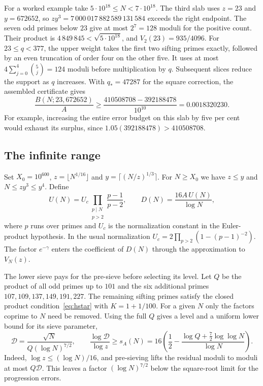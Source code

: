 \documentclass[11pt]{article}
\theoremstyle{remark}\newtheorem{remark}[theorem]{Remark}
\begin{document}
For a worked example take $5\cdot10^{18}\le N<7\cdot10^{18}$. The third slab uses $z=23$ and $y=672652$, so $zy^3=7\,000\,017\,882\,589\,131\,584$ exceeds the right endpoint. The seven odd primes below $23$ give at most $2^7=128$ moduli for the positive count. Their product is $4\,849\,845<\sqrt{5\cdot10^{18}}$, and $V_2(23)=935/4096$. For $23\le q<377$, the upper weight takes the first two sifting primes exactly, followed by an even truncation of order four on the other five. It uses at most $4\sum_{j=0}^4\binom5j=124$ moduli before multiplication by $q$. Subsequent slices reduce the support as $q$ increases. With $q_*=47287$ for the square correction, the assembled certificate gives
\[
 \frac{B(N;23,672652)}{A}
 \ge\frac{410508708-392188478}{10^{10}}
 =0.0018320230 .
\]
For example, increasing the entire error budget on this slab by five per cent would exhaust its surplus, since $1.05(392188478)>410508708$.

\subsection{The infinite range}

Set $X_0=10^{600}$, $z=\lfloor N^{1/16}\rfloor$ and $y=\lceil(N/z)^{1/3}\rceil$. For $N\ge X_0$ we have $z\le y$ and $N\le zy^3\le y^4$. Define
\[
 U(N)=U_c\prod_{\substack{p\mid N\\p>2}}\frac{p-1}{p-2},
 \qquad D(N)=\frac{16 A\,U(N)}{\log N},
\]
where $p$ runs over primes and $U_c$ is the normalization constant in the Euler-product hypothesis. In the usual normalization $U_c=2\prod_{p>2}(1-(p-1)^{-2})$. The factor $e^{-\gamma}$ enters the coefficient of $D(N)$ through the approximation to $V_N(z)$.

The lower sieve pays for the pre-sieve before selecting its level. Let $Q$ be the product of all odd primes up to $101$ and the six additional primes $107,109,137,149,191,227$. The remaining sifting primes satisfy the closed product condition~\eqref{eq:hstar} with $K=1+1/100$. For a given $N$ only the factors coprime to $N$ need be removed. Using the full $Q$ gives a level and a uniform lower bound for its sieve parameter,
\[
 \mathcal D=\frac{\sqrt N}{Q(\log N)^{7/2}},\qquad
 \frac{\log\mathcal D}{\log z}\ge s_A(N)
 =16\left(\frac12-\frac{\log Q+\tfrac72\log\log N}{\log N}\right).
\]
Indeed, $\log z\le(\log N)/16$, and pre-sieving lifts the residual moduli to moduli at most $Q\mathcal D$. This leaves a factor $(\log N)^{7/2}$ below the square-root limit for the progression errors.
\end{document}

